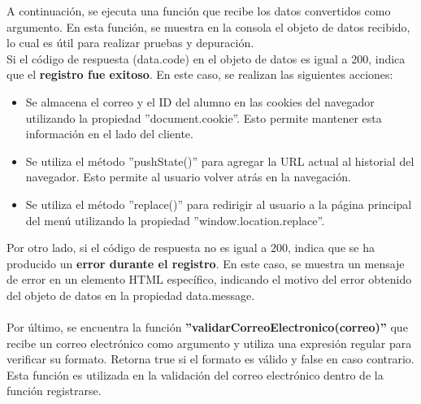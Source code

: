 \documentclass[12pt]{report}
\begin{document}
A continuación, se ejecuta una función que recibe los datos convertidos como argumento. En esta función, se muestra en la consola el objeto de datos recibido, lo cual es útil para realizar pruebas y depuración.
\\
Si el código de respuesta (data.code) en el objeto de datos es igual a 200, indica que el \textbf{registro fue exitoso}. En este caso, se realizan las siguientes acciones:
\begin{itemize}
    \item Se almacena el correo y el ID del alumno en las cookies del navegador utilizando la propiedad ''document.cookie''. Esto permite mantener esta información en el lado del cliente.
    \item Se utiliza el método ''pushState()'' para agregar la URL actual al historial del navegador. Esto permite al usuario volver atrás en la navegación.
    \item Se utiliza el método ''replace()'' para redirigir al usuario a la página principal del menú utilizando la propiedad ''window.location.replace''.
\end{itemize}
Por otro lado, si el código de respuesta no es igual a 200, indica que se ha producido un \textbf{error durante el registro}. En este caso, se muestra un mensaje de error en un elemento HTML específico, indicando el motivo del error obtenido del objeto de datos en la propiedad data.message.
\\\\
Por último, se encuentra la función \textbf{''validarCorreoElectronico(correo)''} que recibe un correo electrónico como argumento y utiliza una expresión regular para verificar su formato. Retorna true si el formato es válido y false en caso contrario. Esta función es utilizada en la validación del correo electrónico dentro de la función registrarse.
\end{document}
